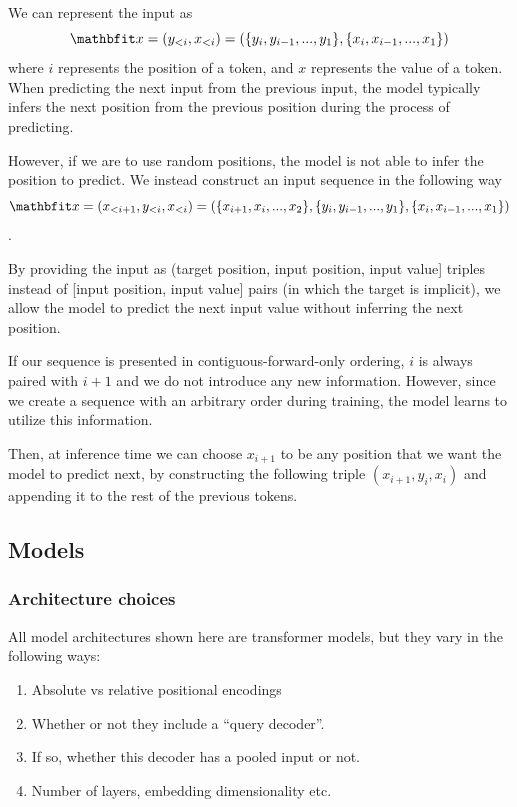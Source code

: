 We can represent the input as
$$
   \x = (y_{<i}, x_{<i}) = ( \{ y_i, y_{i-1}, ..., y_1 \}, \{ x_i, x_{i-1}, ..., x_1 \} )
$$
where $i$ represents the position of a token, and $x$ represents the value of a token. When predicting the next input from the previous input, the model typically infers the next position from the previous position during the process of predicting.

However, if we are to use random positions, the model is not able to infer the position to predict. We instead construct an input sequence in the following way
$$
   \x = (x_{<i+1}, y_{<i}, x_{<i}) = ( \{ x_{i+1}, x_{i}, ..., x_2 \}, \{ y_i, y_{i-1}, ..., y_1 \}, \{ x_i, x_{i-1}, ..., x_1 \} )
$$.

By providing the input as (target position, input position, input value] triples instead of [input position, input value] pairs (in which the target is implicit), we allow the model to predict the next input value without inferring the next position.

If our sequence is presented in contiguous-forward-only ordering, $i$ is always paired with $i+1$ and we do not introduce any new information. However, since we create a sequence with an arbitrary order during training, the model learns to utilize this information.

Then, at inference time we can choose $x_{i+1}$ to be any position that we want the model to predict next, by constructing the following triple $(x_{i+1}, y_i, x_i)$ and appending it to the rest of the previous tokens.


\subsection{Models}

\subsubsection{Architecture choices}

All model architectures shown here are transformer models, but they vary in the following ways:

\begin{enumerate}
    \item Absolute vs relative positional encodings
    \item Whether or not they include a ``query decoder''.
    \item If so, whether this decoder has a pooled input or not.
    \item Number of layers, embedding dimensionality etc.
\end{enumerate}



